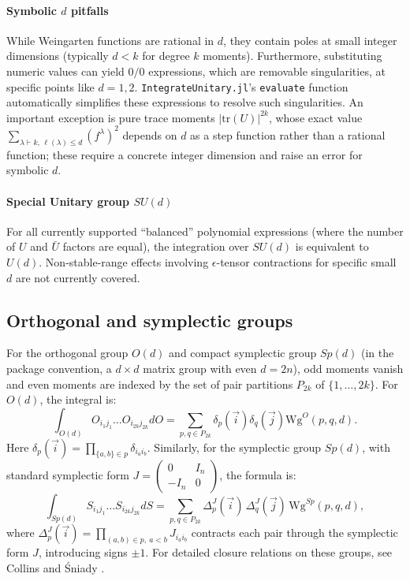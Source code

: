 \documentclass[manuscript,screen]{acmart}
\begin{document}
\paragraph{Symbolic $d$ pitfalls}
While Weingarten functions are rational in $d$, they contain poles at small
integer dimensions (typically $d < k$ for degree $k$ moments). Furthermore,
substituting numeric values can yield $0/0$ expressions, which are removable
singularities, at specific points like $d=1, 2$. \texttt{IntegrateUnitary.jl}'s
\texttt{evaluate} function automatically simplifies these expressions to resolve
such singularities. An important exception is pure trace moments
$|\mathrm{tr}(U)|^{2k}$, whose exact value $\sum_{\lambda \vdash k,\,
\ell(\lambda) \le d} (f^\lambda)^2$ depends on $d$ as a step function rather
than a rational function; these require a concrete integer dimension and raise
an error for symbolic $d$.

\paragraph{Special Unitary group $SU(d)$}
For all currently supported ``balanced'' polynomial expressions (where the
number of $U$ and $\bar{U}$ factors are equal), the integration over $SU(d)$ is
equivalent to $U(d)$. Non-stable-range effects involving $\epsilon$-tensor
contractions for specific small $d$ are not currently covered.

\subsection{Orthogonal and symplectic groups}
For the orthogonal group $O(d)$ and compact symplectic group $Sp(d)$
(in the package convention, a $d \times d$ matrix group with even
$d = 2n$), odd moments vanish and even moments are indexed by the set of
pair partitions $P_{2k}$ of $\{1, \dots, 2k\}$. For $O(d)$, the integral is:
\begin{equation}
\int_{O(d)} O_{i_1 j_1} \dots O_{i_{2k} j_{2k}} dO = \sum_{p, q \in P_{2k}} \delta_p(\vec{i}) \delta_q(\vec{j}) \mathrm{Wg}^O(p, q, d).
\end{equation}
Here $\delta_p(\vec{i}) = \prod_{\{a,b\} \in p} \delta_{i_a i_b}$.
Similarly, for the symplectic group $Sp(d)$, with standard symplectic form
$J=\begin{pmatrix}0&I_n\\-I_n&0\end{pmatrix}$, the formula is:
\begin{equation}
\int_{Sp(d)} S_{i_1 j_1} \dots S_{i_{2k} j_{2k}} dS = \sum_{p, q \in P_{2k}} \Delta^J_p(\vec{i})\, \Delta^J_q(\vec{j})\, \mathrm{Wg}^{Sp}(p, q, d),
\end{equation}
where $\Delta^J_p(\vec{i}) = \prod_{(a,b) \in p,\ a < b} J_{i_a i_b}$
contracts each pair through the symplectic form $J$, introducing signs
$\pm 1$. For detailed closure relations on these groups, see Collins and
\'{S}niady
\cite{collins2006integration}.
\end{document}
